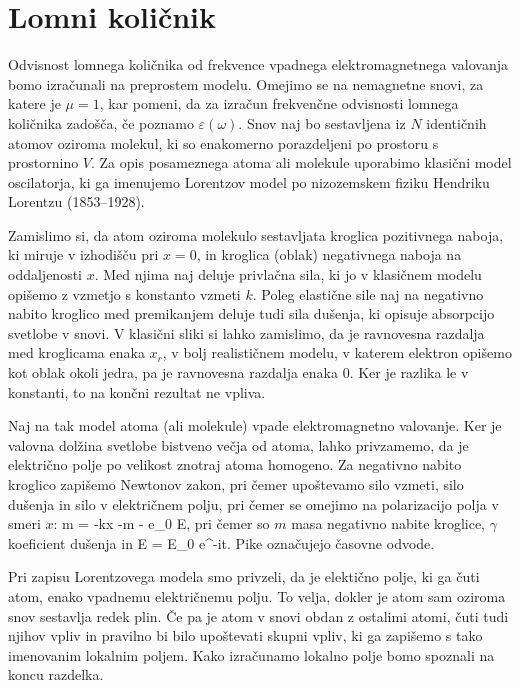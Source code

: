 \section{Lomni količnik}
Odvisnost lomnega količnika od frekvence vpadnega 
elektromagnetnega valovanja bomo izračunali na preprostem modelu. 
Omejimo se na nemagnetne snovi, za katere je $\mu = 1$, kar pomeni, da
za izračun frekvenčne odvisnosti lomnega količnika zadošča, če 
poznamo $\varepsilon(\omega)$. Snov naj bo sestavljena iz $N$
identičnih atomov oziroma molekul, ki so enakomerno porazdeljeni
po prostoru s prostornino $V$. Za opis posameznega atoma ali molekule uporabimo 
klasični model oscilatorja, ki ga imenujemo Lorentzov model 
po nizozemskem fiziku Hendriku Lorentzu (1853--1928). 

Zamislimo si, da atom oziroma molekulo sestavljata kroglica 
pozitivnega naboja, ki miruje v izhodišču pri $x=0$, in kroglica
(oblak) negativnega naboja na oddaljenosti $x$. Med njima naj 
deluje privlačna sila, ki jo v klasičnem modelu opišemo z vzmetjo
s konstanto vzmeti $k$. 
Poleg elastične sile naj na negativno nabito kroglico med 
premikanjem deluje tudi sila dušenja, ki opisuje absorpcijo svetlobe
v snovi. V klasični sliki si lahko
zamislimo, da je ravnovesna razdalja med kroglicama enaka $x_r$, 
v bolj realističnem modelu, v katerem elektron opišemo kot oblak okoli jedra, 
pa je ravnovesna razdalja enaka 0. Ker je razlika le v konstanti, 
to na končni rezultat ne vpliva.

Naj na tak model atoma (ali molekule) vpade elektromagnetno valovanje. Ker je 
valovna dolžina svetlobe bistveno večja od atoma, lahko privzamemo, da
je električno polje po velikost znotraj atoma homogeno. Za negativno nabito
kroglico zapišemo Newtonov zakon, pri čemer upoštevamo silo vzmeti, silo 
dušenja in silo v električnem polju, pri čemer se omejimo na polarizacijo 
polja v smeri $x$:
\beq
m  = -kx -\gamma m  - e_0 E,
\label{eq:09_02}
\eeq
pri čemer so $m$ masa negativno nabite kroglice, $\gamma$ koeficient dušenja
in 
\beq
E = E_0 e^{-i\omega t}.
\label{eq:09_03}
\eeq
Pike označujejo časovne odvode.
\begin{remark}
Pri zapisu Lorentzovega modela smo privzeli, da je elektično polje, 
ki ga čuti atom, enako vpadnemu električnemu polju. 
To velja, dokler je atom sam oziroma snov sestavlja redek plin. Če pa je 
atom v snovi obdan z ostalimi atomi, 
čuti tudi njihov vpliv in pravilno bi bilo upoštevati skupni vpliv, ki 
ga zapišemo s tako imenovanim lokalnim poljem. 
Kako izračunamo lokalno polje bomo spoznali na koncu razdelka. 
\end{remark}

